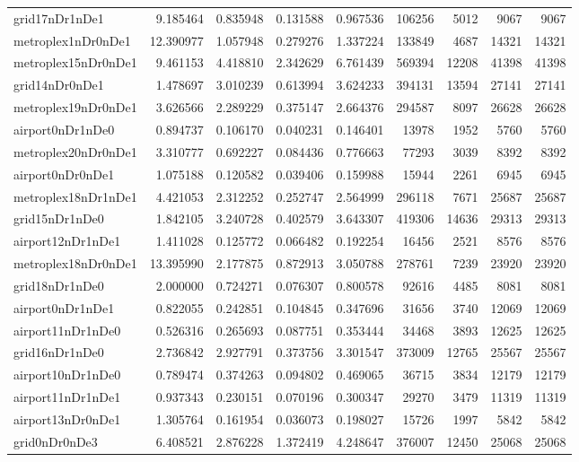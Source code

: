 \begin{longtable}{|l|r|r|r|r|r|r|r|r|}
grid17nDr1nDe1 & 9.185464 & 0.835948 & 0.131588 & 0.967536 & 106256 & 5012 & 9067 & 9067 \\
metroplex1nDr0nDe1 & 12.390977 & 1.057948 & 0.279276 & 1.337224 & 133849 & 4687 & 14321 & 14321 \\
metroplex15nDr0nDe1 & 9.461153 & 4.418810 & 2.342629 & 6.761439 & 569394 & 12208 & 41398 & 41398 \\
grid14nDr0nDe1 & 1.478697 & 3.010239 & 0.613994 & 3.624233 & 394131 & 13594 & 27141 & 27141 \\
metroplex19nDr0nDe1 & 3.626566 & 2.289229 & 0.375147 & 2.664376 & 294587 & 8097 & 26628 & 26628 \\
airport0nDr1nDe0 & 0.894737 & 0.106170 & 0.040231 & 0.146401 & 13978 & 1952 & 5760 & 5760 \\
metroplex20nDr0nDe1 & 3.310777 & 0.692227 & 0.084436 & 0.776663 & 77293 & 3039 & 8392 & 8392 \\
airport0nDr0nDe1 & 1.075188 & 0.120582 & 0.039406 & 0.159988 & 15944 & 2261 & 6945 & 6945 \\
metroplex18nDr1nDe1 & 4.421053 & 2.312252 & 0.252747 & 2.564999 & 296118 & 7671 & 25687 & 25687 \\
grid15nDr1nDe0 & 1.842105 & 3.240728 & 0.402579 & 3.643307 & 419306 & 14636 & 29313 & 29313 \\
airport12nDr1nDe1 & 1.411028 & 0.125772 & 0.066482 & 0.192254 & 16456 & 2521 & 8576 & 8576 \\
metroplex18nDr0nDe1 & 13.395990 & 2.177875 & 0.872913 & 3.050788 & 278761 & 7239 & 23920 & 23920 \\
grid18nDr1nDe0 & 2.000000 & 0.724271 & 0.076307 & 0.800578 & 92616 & 4485 & 8081 & 8081 \\
airport0nDr1nDe1 & 0.822055 & 0.242851 & 0.104845 & 0.347696 & 31656 & 3740 & 12069 & 12069 \\
airport11nDr1nDe0 & 0.526316 & 0.265693 & 0.087751 & 0.353444 & 34468 & 3893 & 12625 & 12625 \\
grid16nDr1nDe0 & 2.736842 & 2.927791 & 0.373756 & 3.301547 & 373009 & 12765 & 25567 & 25567 \\
airport10nDr1nDe0 & 0.789474 & 0.374263 & 0.094802 & 0.469065 & 36715 & 3834 & 12179 & 12179 \\
airport11nDr1nDe1 & 0.937343 & 0.230151 & 0.070196 & 0.300347 & 29270 & 3479 & 11319 & 11319 \\
airport13nDr0nDe1 & 1.305764 & 0.161954 & 0.036073 & 0.198027 & 15726 & 1997 & 5842 & 5842 \\
grid0nDr0nDe3 & 6.408521 & 2.876228 & 1.372419 & 4.248647 & 376007 & 12450 & 25068 & 25068 \\

\end{longtable}
